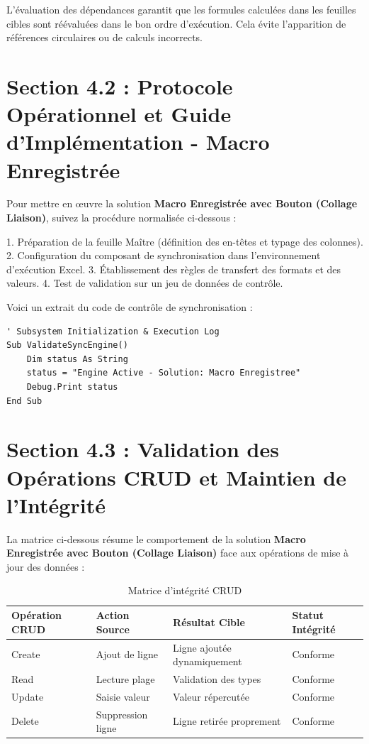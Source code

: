 \documentclass[12pt,a4paper]{report}
\begin{document}
L'évaluation des dépendances garantit que les formules calculées dans les feuilles cibles sont réévaluées dans le bon ordre d'exécution. Cela évite l'apparition de références circulaires ou de calculs incorrects.


\section{Section 4.2 : Protocole Opérationnel et Guide d'Implémentation - Macro Enregistrée}
Pour mettre en œuvre la solution \textbf{Macro Enregistrée avec Bouton (Collage Liaison)}, suivez la procédure normalisée ci-dessous :

1. Préparation de la feuille Maître (définition des en-têtes et typage des colonnes).
2. Configuration du composant de synchronisation dans l'environnement d'exécution Excel.
3. Établissement des règles de transfert des formats et des valeurs.
4. Test de validation sur un jeu de données de contrôle.

Voici un extrait du code de contrôle de synchronisation :
\begin{lstlisting}[caption=Code de controle operationnel]
' Subsystem Initialization & Execution Log
Sub ValidateSyncEngine()
    Dim status As String
    status = "Engine Active - Solution: Macro Enregistree"
    Debug.Print status
End Sub
\end{lstlisting}


\section{Section 4.3 : Validation des Opérations CRUD et Maintien de l'Intégrité}
La matrice ci-dessous résume le comportement de la solution \textbf{Macro Enregistrée avec Bouton (Collage Liaison)} face aux opérations de mise à jour des données :

\begin{table}[h]
\centering
\begin{tabular}{@{}llll@{}}
\toprule
\textbf{Opération CRUD} & \textbf{Action Source} & \textbf{Résultat Cible} & \textbf{Statut Intégrité} \\ \midrule
Create & Ajout de ligne & Ligne ajoutée dynamiquement & Conforme \\
Read & Lecture plage & Validation des types & Conforme \\
Update & Saisie valeur & Valeur répercutée & Conforme \\
Delete & Suppression ligne & Ligne retirée proprement & Conforme \\ \bottomrule
\end{tabular}
\caption{Matrice d'intégrité CRUD}
\end{table}
\end{document}
